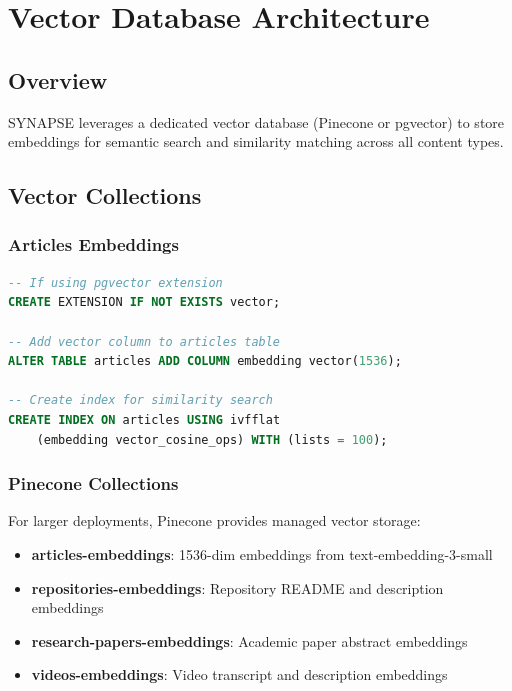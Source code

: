 \documentclass[12pt,a4paper]{report}
\begin{document}
\newpage

\chapter{Vector Database Architecture}

\section{Overview}

SYNAPSE leverages a dedicated vector database (Pinecone or pgvector) to store embeddings for semantic search and similarity matching across all content types.

\section{Vector Collections}

\subsection{Articles Embeddings}

\begin{lstlisting}[language=SQL,basicstyle=\ttfamily\small]
-- If using pgvector extension
CREATE EXTENSION IF NOT EXISTS vector;

-- Add vector column to articles table
ALTER TABLE articles ADD COLUMN embedding vector(1536);

-- Create index for similarity search
CREATE INDEX ON articles USING ivfflat 
    (embedding vector_cosine_ops) WITH (lists = 100);
\end{lstlisting}

\subsection{Pinecone Collections}

For larger deployments, Pinecone provides managed vector storage:

\begin{itemize}
    \item \textbf{articles-embeddings}: 1536-dim embeddings from text-embedding-3-small
    \item \textbf{repositories-embeddings}: Repository README and description embeddings
    \item \textbf{research-papers-embeddings}: Academic paper abstract embeddings
    \item \textbf{videos-embeddings}: Video transcript and description embeddings
\end{itemize}
\end{document}
